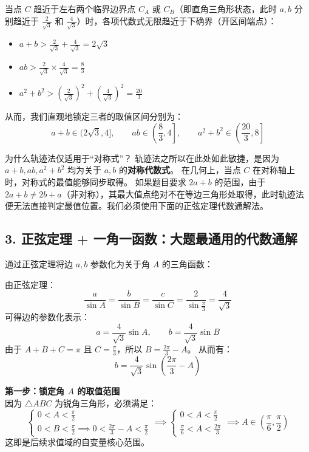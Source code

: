\documentclass[11pt, a4paper]{ctexart}
\begin{document}
当点 $C$ 趋近于左右两个临界边界点 $C_A$ 或 $C_B$（即直角三角形状态，此时 $a,b$ 分别趋近于 $\frac{2}{\sqrt{3}}$ 和 $\frac{4}{\sqrt{3}}$）时，各项代数式无限趋近于下确界（开区间端点）：
\begin{itemize}
  \item $a+b > \frac{2}{\sqrt{3}} + \frac{4}{\sqrt{3}} = 2\sqrt{3}$
  \item $ab > \frac{2}{\sqrt{3}} \times \frac{4}{\sqrt{3}} = \frac{8}{3}$
  \item $a^2+b^2 > \left(\frac{2}{\sqrt{3}}\right)^2 + \left(\frac{4}{\sqrt{3}}\right)^2 = \frac{20}{3}$
\end{itemize}

从而，我们直观地锁定三者的取值区间分别为：
\[
a+b \in (2\sqrt{3}, 4], \qquad ab \in \left(\frac{8}{3}, 4\right], \qquad a^2+b^2 \in \left(\frac{20}{3}, 8\right]
\]

\begin{conceptbox}{为什么轨迹法仅适用于“对称式”？}
轨迹法之所以在此处如此敏捷，是因为 $a+b, ab, a^2+b^2$ 均为关于 $a,b$ 的\textbf{对称代数式}。
在几何上，当点 $C$ 在对称轴上时，对称式的最值能够同步取得。
如果题目要求 $2a+b$ 的范围，由于 $2a+b \ne 2b+a$（非对称），其最大值点绝对不在等边三角形处取得，此时轨迹法便无法直接判定最值位置。我们必须使用下面的正弦定理代数通解法。
\end{conceptbox}

\subsection{3. 正弦定理 + 一角一函数：大题最通用的代数通解}
通过正弦定理将边 $a, b$ 参数化为关于角 $A$ 的三角函数：

由正弦定理：
\[
\frac{a}{\sin A} = \frac{b}{\sin B} = \frac{c}{\sin C} = \frac{2}{\sin\frac{\pi}{3}} = \frac{4}{\sqrt{3}}
\]
可得边的参数化表示：
\[
a = \frac{4}{\sqrt{3}}\sin A, \qquad b = \frac{4}{\sqrt{3}}\sin B
\]
由于 $A + B + C = \pi$ 且 $C = \frac{\pi}{3}$，所以 $B = \frac{2\pi}{3} - A$。
从而有：
\[
b = \frac{4}{\sqrt{3}}\sin\left(\frac{2\pi}{3} - A\right)
\]

\textbf{第一步：锁定角 $A$ 的取值范围}\\
因为 $\triangle ABC$ 为锐角三角形，必须满足：
\[
\begin{cases}
  0 < A < \frac{\pi}{2} \\
  0 < B < \frac{\pi}{2} \implies 0 < \frac{2\pi}{3} - A < \frac{\pi}{2}
\end{cases}
\implies
\begin{cases}
  0 < A < \frac{\pi}{2} \\
  \frac{\pi}{6} < A < \frac{2\pi}{3}
\end{cases}
\implies A \in \left(\frac{\pi}{6}, \frac{\pi}{2}\right)
\]
这即是后续求值域的自变量核心范围。
\end{document}
